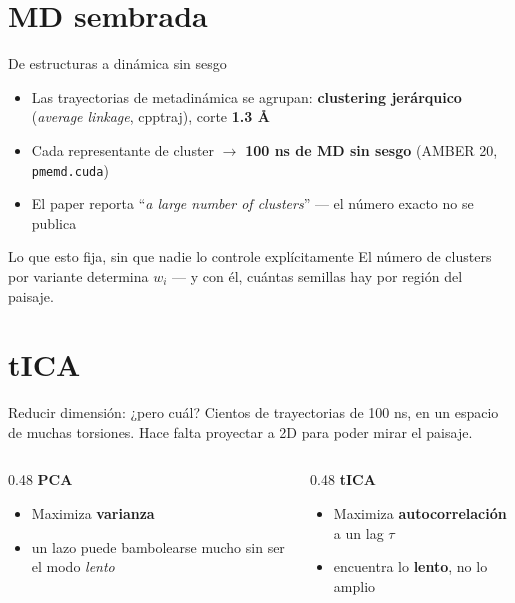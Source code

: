 \documentclass[aspectratio=169,11pt]{beamer}
\begin{document}
\section{MD sembrada}

\begin{frame}{De estructuras a dinámica sin sesgo}
  \begin{itemize}
    \item Las trayectorias de metadinámica se agrupan: \textbf{clustering jerárquico} (\textit{average linkage}, cpptraj), corte \textbf{1.3 \r{A}}
    \item Cada representante de cluster $\to$ \textbf{100 ns de MD sin sesgo} (AMBER 20, \texttt{pmemd.cuda})
    \item El paper reporta ``\textit{a large number of clusters}'' — el número exacto \alert{no se publica}
  \end{itemize}
  \vspace{0.6em}
  \begin{alertblock}{Lo que esto fija, sin que nadie lo controle explícitamente}
    El número de clusters por variante determina $w_i$ — y con él, cuántas semillas hay por región del paisaje.
  \end{alertblock}
\end{frame}

\section{tICA}

\begin{frame}{Reducir dimensión: ¿pero cuál?}
  Cientos de trayectorias de 100 ns, en un espacio de muchas torsiones. Hace falta proyectar a 2D para poder mirar el paisaje.
  \begin{columns}[T]
    \begin{column}{0.48\textwidth}
      \textbf{PCA}
      \begin{itemize}
        \item Maximiza \textbf{varianza}
        \item[\textcolor{minaranja}{$-$}] un lazo puede bambolearse mucho sin ser el modo \emph{lento}
      \end{itemize}
    \end{column}
    \begin{column}{0.48\textwidth}
      \textbf{tICA}
      \begin{itemize}
        \item Maximiza \textbf{autocorrelación} a un lag $\tau$
        \item[\textcolor{teal}{$+$}] encuentra lo \textbf{lento}, no lo amplio
      \end{itemize}
    \end{column}
  \end{columns}
\end{frame}
\end{document}
